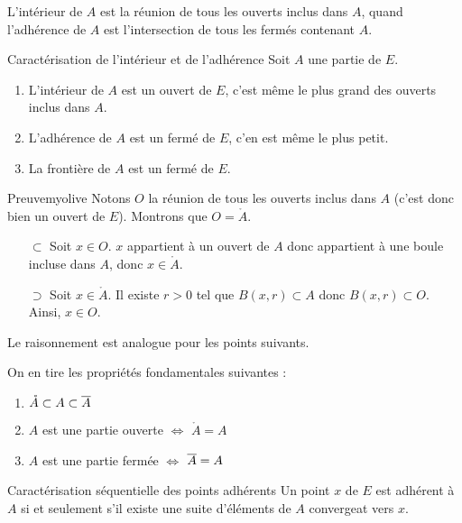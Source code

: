     L’intérieur de $A$ est la réunion de tous les ouverts inclus dans $A$, quand l’adhérence de $A$ est l’intersection de tous les fermés contenant $A$.

    \begin{prop}{Caractérisation de l’intérieur et de l’adhérence}
        Soit $A$ une partie de $E$.
        \begin{enumerate}
            \item L’intérieur de $A$ est un ouvert de $E$, c’est même le plus grand des ouverts inclus dans $A$.
            \item L’adhérence de $A$ est un fermé de $E$, c’en est même le plus petit.
            \item La frontière de $A$ est un fermé de $E$.
        \end{enumerate}
    \end{prop}

    \begin{demo}{Preuve}{myolive}
        Notons $O$ la réunion de tous les ouverts inclus dans $A$ (c’est donc bien un ouvert de $E$). Montrons que $O = \mathring{A}$.
        \begin{itemize}
            \item[$\subset$] Soit $x \in O$. $x$ appartient à un ouvert de $A$ donc appartient à une boule incluse dans $A$, donc $x \in \mathring{A}$.
            \item[$\supset$] Soit $x \in \mathring{A}$. Il existe $r > 0$ tel que $B(x,r) \subset A$ donc $B(x,r) \subset O$. Ainsi, $x \in O$.
        \end{itemize}
        Le raisonnement est analogue pour les points suivants.
    \end{demo}

    On en tire les propriétés fondamentales suivantes :
    \begin{enumerate}
        \item $\mathring{A} \subset A \subset \overline{A}$
        \item $A$ est une partie ouverte $\iff$ $\mathring{A} = A$
        \item $A$ est une partie fermée $\iff$ $\overline{A} = A$
    \end{enumerate}

    \begin{prop}{Caractérisation séquentielle des points adhérents}
        Un point $x$ de $E$ est adhérent à $A$ si et seulement s’il existe une suite d’éléments de $A$ convergeat vers $x$.
    \end{prop}

